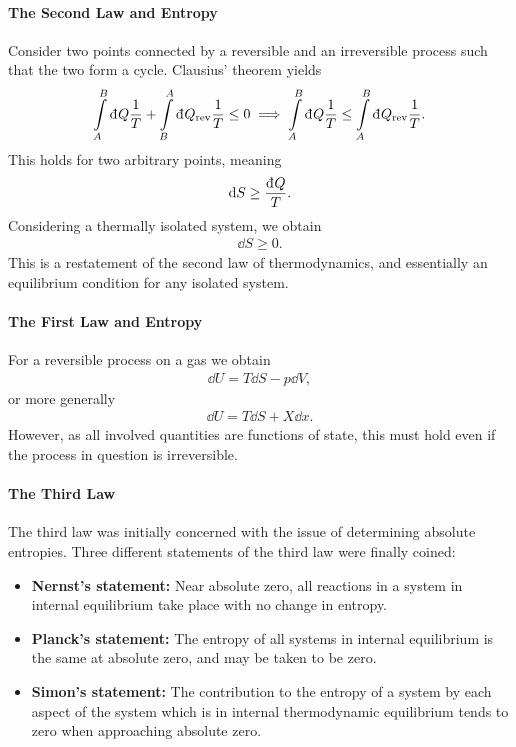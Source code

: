 \paragraph{The Second Law and Entropy}
Consider two points connected by a reversible and an irreversible process such that the two form a cycle. Clausius' theorem yields
\begin{align*}
	\intin{A}{B}{Q}{\frac{1}{T}} + \intin{B}{A}{Q_{\text{rev}}}{\frac{1}{T}} \leq 0 \implies \intin{A}{B}{Q}{\frac{1}{T}} \leq \intin{A}{B}{Q_{\text{rev}}}{\frac{1}{T}}.
\end{align*}
This holds for two arbitrary points, meaning
\begin{align*}
	\dd{S} \geq \frac{\din{Q}}{T}.
\end{align*}
Considering a thermally isolated system, we obtain
\begin{align*}
	\dd{S} \geq 0.
\end{align*}
This is a restatement of the second law of thermodynamics, and essentially an equilibrium condition for any isolated system.

\paragraph{The First Law and Entropy}
For a reversible process on a gas we obtain
\begin{align*}
	\dd{U} = T\dd{S} - p\dd{V},
\end{align*}
or more generally
\begin{align*}
	\dd{U} = T\dd{S} + X\dd{x}.
\end{align*}
However, as all involved quantities are functions of state, this must hold even if the process in question is irreversible.

\paragraph{The Third Law}
The third law was initially concerned with the issue of determining absolute entropies. Three different statements of the third law were finally coined:

\begin{itemize}
	\item \textbf{Nernst's statement:} Near absolute zero, all reactions in a system in internal equilibrium take place with no change in entropy.
	\item \textbf{Planck's statement:} The entropy of all systems in internal equilibrium is the same at absolute zero, and may be taken to be zero.
	\item \textbf{Simon's statement:} The contribution to the entropy of a system by each aspect of the system which is in internal thermodynamic equilibrium tends to zero when approaching absolute zero.
\end{itemize}

